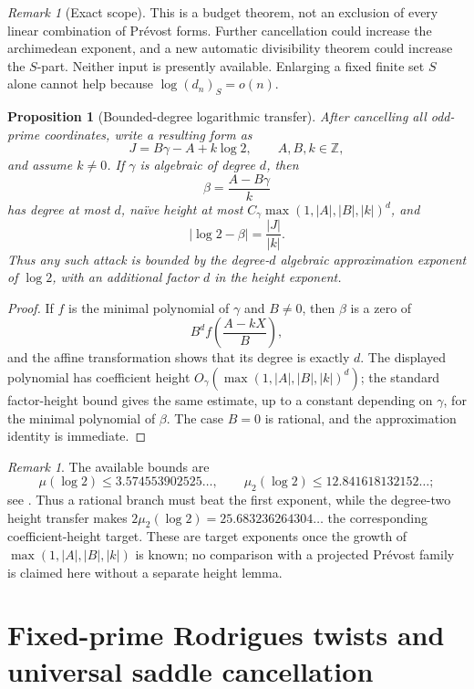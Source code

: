 \documentclass[11pt]{article}
\newtheorem{proposition}[theorem]{Proposition}
\theoremstyle{definition}
\theoremstyle{remark}
\newtheorem{remark}[theorem]{Remark}
\newcommand{\Z}{\mathbb Z}
\begin{document}
\begin{remark}[Exact scope]
This is a budget theorem, not an exclusion of every linear combination of
Pr\'evost forms.  Further cancellation could increase the archimedean
exponent, and a new automatic divisibility theorem could increase the
\(S\)-part.  Neither input is presently available.  Enlarging a fixed finite
set \(S\) alone cannot help because \(\log(d_n)_S=o(n)\).
\end{remark}

\begin{proposition}[Bounded-degree logarithmic transfer]
\label{prop:bounded-degree-transfer}
After cancelling all odd-prime coordinates, write a resulting form as
\[
 J=B\gamma-A+k\log2,
 \qquad A,B,k\in\Z,
\]
and assume \(k\ne0\).  If \(\gamma\) is algebraic of degree \(d\), then
\[
 \beta=\frac{A-B\gamma}{k}
\]
has degree at most \(d\), naïve height at most
\(C_\gamma\max(1,|A|,|B|,|k|)^d\), and
\[
 |\log2-\beta|=\frac{|J|}{|k|}.
\]
Thus any such attack is bounded by the degree-\(d\) algebraic approximation
exponent of \(\log2\), with an additional factor \(d\) in the height
exponent.
\end{proposition}

\begin{proof}
If \(f\) is the minimal polynomial of \(\gamma\) and \(B\ne0\), then
\(\beta\) is a zero of
\[
 B^df\!\left(\frac{A-kX}{B}\right),
\]
and the affine transformation shows that its degree is exactly \(d\).
The displayed polynomial has coefficient height
\(O_\gamma(\max(1,|A|,|B|,|k|)^d)\); the standard factor-height bound
gives the same estimate, up to a constant depending on \(\gamma\), for the
minimal polynomial of \(\beta\).  The case \(B=0\) is rational, and the
approximation identity is immediate.
\end{proof}

\begin{remark}
The available bounds are
\[
 \mu(\log2)\le3.574553902525\ldots,
 \qquad
 \mu_2(\log2)\le12.841618132152\ldots;
\]
see \cite{Marcovecchio2009,Marcovecchio2025}.  Thus a rational branch must
beat the first exponent, while the degree-two height transfer makes
\(2\mu_2(\log2)=25.683236264304\ldots\) the corresponding coefficient-height
target.  These are target exponents once the growth of
\(\max(1,|A|,|B|,|k|)\) is known; no comparison with a projected Pr\'evost
family is claimed here without a separate height lemma.
\end{remark}

\section{Fixed-prime Rodrigues twists and universal saddle cancellation}
\label{sec:fixed-prime-rodrigues}
\end{document}

